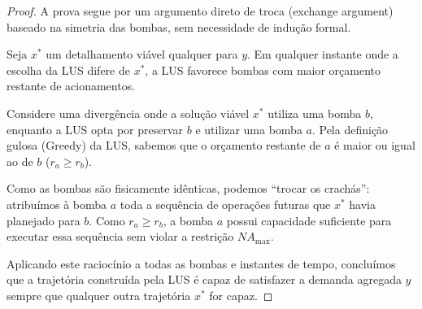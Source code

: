 \documentclass{article}
\theoremstyle{definition}
\begin{document}
\begin{proof}
	A prova segue por um argumento direto de troca (exchange argument) baseado na simetria das bombas, sem necessidade de indução formal.

	Seja $x^*$ um detalhamento viável qualquer para $y$. Em qualquer instante onde a escolha da LUS difere de $x^*$, a LUS favorece bombas com maior orçamento restante de acionamentos.

	Considere uma divergência onde a solução viável $x^*$ utiliza uma bomba $b$, enquanto a LUS opta por preservar $b$ e utilizar uma bomba $a$. Pela definição gulosa (Greedy) da LUS, sabemos que o orçamento restante de $a$ é maior ou igual ao de $b$ ($r_a \ge r_b$).

	Como as bombas são fisicamente idênticas, podemos ``trocar os crachás'': atribuímos à bomba $a$ toda a sequência de operações futuras que $x^*$ havia planejado para $b$. Como $r_a \ge r_b$, a bomba $a$ possui capacidade suficiente para executar essa sequência sem violar a restrição $NA_{\max}$.

	Aplicando este raciocínio a todas as bombas e instantes de tempo, concluímos que a trajetória construída pela LUS é capaz de satisfazer a demanda agregada $y$ sempre que qualquer outra trajetória $x^*$ for capaz.
\end{proof}
\end{document}

